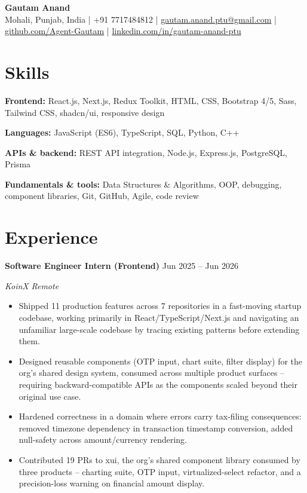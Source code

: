 \documentclass[letterpaper,10.5pt]{article}
\newcommand{\ResumeHeader}[2]{%
  \begin{center}
    {\Huge\bfseries #1}\\[5pt]
    {\small #2}%
  \end{center}\vspace{-6pt}}
\newcommand{\Entry}[4]{%
  \textbf{#1} \hfill {\small #2}\par
  \textit{\small #3} \hfill {\small\textit{#4}}\par\vspace{-1pt}}
\newenvironment{Bullets}
  {\begin{itemize}[leftmargin=1.15em,itemsep=1.5pt,parsep=0pt,topsep=3pt]\small}
  {\end{itemize}\vspace{3pt}}
\newcommand{\SkillRow}[2]{{\small \textbf{#1:} #2}\par\vspace{1.5pt}}
\begin{document}
\ResumeHeader{Gautam Anand}
  {Mohali, Punjab, India \;|\; +91 7717484812 \;|\;
   \href{mailto:gautam.anand.ptu@gmail.com}{gautam.anand.ptu@gmail.com} \;|\;
   \href{https://github.com/Agent-Gautam}{github.com/Agent-Gautam} \;|\;
   \href{https://www.linkedin.com/in/gautam-anand-ptu}{linkedin.com/in/gautam-anand-ptu}}

\section{Skills}
\SkillRow{Frontend}{React.js, Next.js, Redux Toolkit, HTML, CSS, Bootstrap 4/5, Sass, Tailwind CSS, shadcn/ui, responsive design}
\SkillRow{Languages}{JavaScript (ES6), TypeScript, SQL, Python, C++}
\SkillRow{APIs \& backend}{REST API integration, Node.js, Express.js, PostgreSQL, Prisma}
\SkillRow{Fundamentals \& tools}{Data Structures \& Algorithms, OOP, debugging, component libraries, Git, GitHub, Agile, code review}

\section{Experience}
\Entry{Software Engineer Intern (Frontend)}{Jun 2025 -- Jun 2026}{KoinX}{Remote}
\begin{Bullets}
  \item Shipped 11 production features across 7 repositories in a fast-moving startup codebase, working primarily in React/TypeScript/Next.js and navigating an unfamiliar large-scale codebase by tracing existing patterns before extending them.
  \item Designed reusable components (OTP input, chart suite, filter display) for the org's shared design system, consumed across multiple product surfaces -- requiring backward-compatible APIs as the components scaled beyond their original use case.
  \item Hardened correctness in a domain where errors carry tax-filing consequences: removed timezone dependency in transaction timestamp conversion, added null-safety across amount/currency rendering.
  \item Contributed 19 PRs to xui, the org's shared component library consumed by three products -- charting suite, OTP input, virtualized-select refactor, and a precision-loss warning on financial amount display.
\end{Bullets}
\end{document}
